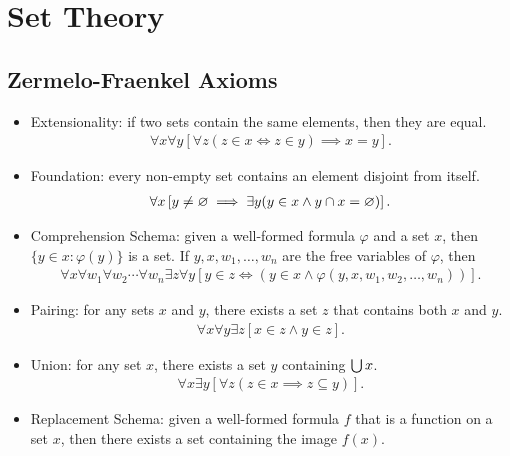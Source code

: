\setchaptergraphic{}

\chapter{Set Theory}
\label{ch:sets}

\section{Zermelo-Fraenkel Axioms}

\begin{itemize}
    \item Extensionality: if two sets contain the same elements, then they are equal.
    \begin{align*}
        \forall x\forall y \left[\forall z \left(z \in x \iff z \in y\right) \implies x = y\right].
    \end{align*}
    \item Foundation: every non-empty set contains an element disjoint from itself.
    \begin{align*}
        \forall x\left[y \neq \varnothing \implies \exists y(y \in x \land y \cap x = \varnothing)\right].
    \end{align*}
    \item Comprehension Schema: given a well-formed formula $\varphi$ and a set $x$, then $\{y \in x : \varphi(y)\}$ is a set. If $y, x, w_1, \ldots, w_n$ are the free variables of $\varphi$, then
    \begin{align*}
        \forall x\forall w_1\forall w_2 \cdots \forall w_n \exists z\forall y\left[y \in z \iff \left(y \in x \land \varphi(y, x, w_1, w_2, \ldots, w_n)\right)\right].
    \end{align*}
    \item Pairing: for any sets $x$ and $y$, there exists a set $z$ that contains both $x$ and $y$.
    \begin{align*}
        \forall x\forall y \exists z\left[x \in z \land y \in z\right].
    \end{align*}
    \item Union: for any set $x$, there exists a set $y$ containing $\bigcup x$.
    \begin{align*}
        \forall x\exists y\left[\forall z\left(z \in x \implies z \subseteq y\right)\right].
    \end{align*}
    \item Replacement Schema: given a well-formed formula $f$ that is a function on a set $x$, then there exists a set containing the image $f(x)$.

\end{itemize}

